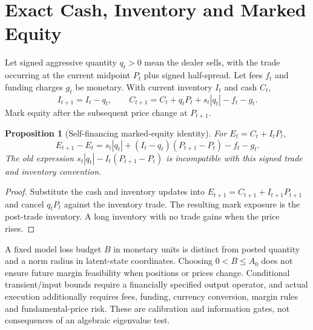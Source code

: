 \documentclass[11pt]{article}
\newtheorem{proposition}{Proposition}
\begin{document}
\section{Exact Cash, Inventory and Marked Equity}
Let signed aggressive quantity $q_t>0$ mean the dealer sells, with the trade occurring at the current midpoint $P_t$ plus signed half-spread. Let fees $f_t$ and funding charges $g_t$ be monetary. With current inventory $I_t$ and cash $C_t$,
\[
I_{t+1}=I_t-q_t,\qquad
C_{t+1}=C_t+q_tP_t+s_t|q_t|-f_t-g_t.
\]
Mark equity after the subsequent price change at $P_{t+1}$.
\begin{proposition}[Self-financing marked-equity identity]
For $E_t=C_t+I_tP_t$,
\[
E_{t+1}-E_t=s_t|q_t|+(I_t-q_t)(P_{t+1}-P_t)-f_t-g_t.
\]
The old expression $s_t|q_t|-I_t(P_{t+1}-P_t)$ is incompatible with this signed trade and inventory convention.
\end{proposition}
\begin{proof}
Substitute the cash and inventory updates into $E_{t+1}=C_{t+1}+I_{t+1}P_{t+1}$ and cancel $q_tP_t$ against the inventory trade. The resulting mark exposure is the post-trade inventory. A long inventory with no trade gains when the price rises.
\end{proof}

A fixed model loss budget $B$ in monetary units is distinct from posted quantity and a norm radius in latent-state coordinates. Choosing $0<B\le A_0$ does not ensure future margin feasibility when positions or prices change. Conditional transient/input bounds require a financially specified output operator, and actual execution additionally requires fees, funding, currency conversion, margin rules and fundamental-price risk. These are calibration and information gates, not consequences of an algebraic eigenvalue test.
\end{document}
